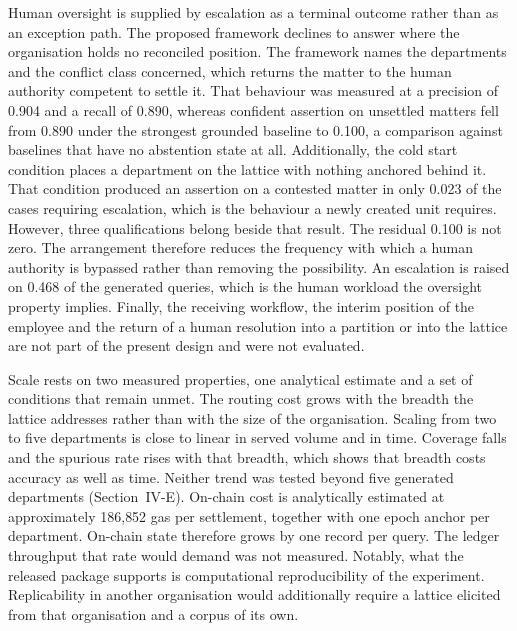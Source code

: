\documentclass[journal]{IEEEtran}
\begin{document}
Human oversight is supplied by escalation as a terminal outcome rather than as an exception path. The proposed framework declines to answer where the organisation holds no reconciled position. The framework names the departments and the conflict class concerned, which returns the matter to the human authority competent to settle it. That behaviour was measured at a precision of 0.904 and a recall of 0.890, whereas confident assertion on unsettled matters fell from 0.890 under the strongest grounded baseline to 0.100, a comparison against baselines that have no abstention state at all. Additionally, the cold start condition places a department on the lattice with nothing anchored behind it. That condition produced an assertion on a contested matter in only 0.023 of the cases requiring escalation, which is the behaviour a newly created unit requires. However, three qualifications belong beside that result. The residual 0.100 is not zero. The arrangement therefore reduces the frequency with which a human authority is bypassed rather than removing the possibility. An escalation is raised on 0.468 of the generated queries, which is the human workload the oversight property implies. Finally, the receiving workflow, the interim position of the employee and the return of a human resolution into a partition or into the lattice are not part of the present design and were not evaluated.

Scale rests on two measured properties, one analytical estimate and a set of conditions that remain unmet. The routing cost grows with the breadth the lattice addresses rather than with the size of the organisation. Scaling from two to five departments is close to linear in served volume and in time. Coverage falls and the spurious rate rises with that breadth, which shows that breadth costs accuracy as well as time. Neither trend was tested beyond five generated departments (Section~IV-E). On-chain cost is analytically estimated at approximately 186{,}852 gas per settlement, together with one epoch anchor per department. On-chain state therefore grows by one record per query. The ledger throughput that rate would demand was not measured. Notably, what the released package supports is computational reproducibility of the experiment. Replicability in another organisation would additionally require a lattice elicited from that organisation and a corpus of its own.
\end{document}
